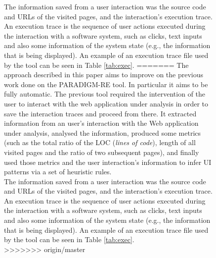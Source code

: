 \documentclass[conference]{IEEEtran}
\begin{document}
\begin{enumerate}
\begin{figure}[!htb]
\begin{itemize}
The information saved from a user interaction was the source code and URLs of the visited pages, and the interaction's execution trace. An execution trace is the sequence of user actions executed during the interaction with a software system, such as clicks, text inputs and also some information of the system state (e.g., the information that is being displayed). An example of an execution trace file used by the tool can be seen in Table \ref{tab:exec}.
=======
The  approach described in this paper aims to improve on the previous work \cite{nabuco2013inferring} done on the PARADIGM-RE tool. In particular it aims to be fully automatic. The previous tool required the intervention of the user to interact with the web application under analysis in order to save the interaction traces and proceed from there. It extracted information from an user's interaction with the Web application under analysis, analysed the information, produced some metrics (such as the total ratio of the LOC (\textit{lines of code}), length of all visited pages and the ratio of two subsequent pages), and finally used those metrics and the user interaction's information to infer UI patterns via a set of heuristic rules. \\

The information saved from a user interaction was the source code and URLs of the visited pages, and the interaction's execution trace. An execution trace is the sequence of user actions executed during the interaction with a software system, such as clicks, text inputs and also some information of the system state (e.g., the information that is being displayed). An example of an execution trace file used by the tool can be seen in Table \ref{tab:exec}.\\
>>>>>>> origin/master


\end{itemize}
\end{figure}
\end{enumerate}
\end{document}
